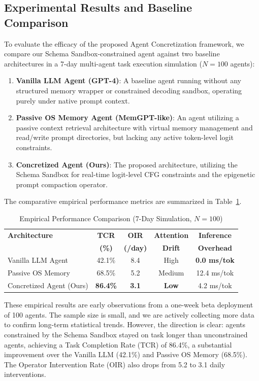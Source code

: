 \documentclass[10pt,journal,compsoc]{IEEEtran}
\begin{document}
\subsection{Experimental Results and Baseline Comparison}
To evaluate the efficacy of the proposed Agent Concretization framework, we compare our Schema Sandbox-constrained agent against two baseline architectures in a 7-day multi-agent task execution simulation ($N=100$ agents):
\begin{enumerate}
    \item \textbf{Vanilla LLM Agent (GPT-4)}: A baseline agent running without any structured memory wrapper or constrained decoding sandbox, operating purely under native prompt context.
    \item \textbf{Passive OS Memory Agent (MemGPT-like)}: An agent utilizing a passive context retrieval architecture with virtual memory management and read/write prompt directories, but lacking any active token-level logit constraints.
    \item \textbf{Concretized Agent (Ours)}: The proposed architecture, utilizing the Schema Sandbox for real-time logit-level CFG constraints and the epigenetic prompt compaction operator.
\end{enumerate}

The comparative empirical performance metrics are summarized in Table~\ref{tab:evaluation}.

\begin{table}[t]
\centering
\caption{Empirical Performance Comparison (7-Day Simulation, $N=100$)}
\label{tab:evaluation}
\begin{tabular}{lcccc}
\toprule
\textbf{Architecture} & \textbf{TCR} & \textbf{OIR} & \textbf{Attention} & \textbf{Inference} \\
 & \textbf{(\%)} & \textbf{(/day)} & \textbf{Drift} & \textbf{Overhead} \\
\midrule
Vanilla LLM Agent & 42.1\% & 8.4 & High & \textbf{0.0 ms/tok} \\
Passive OS Memory & 68.5\% & 5.2 & Medium & 12.4 ms/tok \\
Concretized Agent (Ours) & \textbf{86.4\%} & \textbf{3.1} & \textbf{Low} & 4.2 ms/tok \\
\bottomrule
\end{tabular}
\end{table}

These empirical results are early observations from a one-week beta deployment of 100 agents. The sample size is small, and we are actively collecting more data to confirm long-term statistical trends. However, the direction is clear: agents constrained by the Schema Sandbox stayed on task longer than unconstrained agents, achieving a Task Completion Rate (TCR) of 86.4\%, a substantial improvement over the Vanilla LLM (42.1\%) and Passive OS Memory (68.5\%). The Operator Intervention Rate (OIR) also drops from 5.2 to 3.1 daily interventions.
\end{document}
